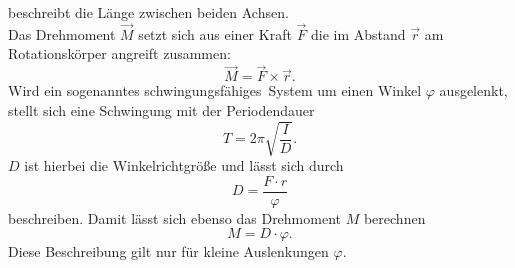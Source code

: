 beschreibt die Länge zwischen beiden Achsen.\\ \noindent
Das Drehmoment $\vec M$ setzt sich aus einer Kraft $\vec F$ die im Abstand $\vec r$ am Rotationskörper 
angreift zusammen:
\begin{equation}
    \vec M=\vec F\times\vec r.
\end{equation}
Wird ein sogenanntes \glqq schwingungsfähiges\grqq\, System um einen Winkel $\varphi$ ausgelenkt,
stellt sich eine Schwingung mit der  Periodendauer 
\begin{equation}
    T=2\pi\sqrt{\frac{I}{D}}.
    \label{eq:Schwingungsdauer}
\end{equation}
$D$ ist hierbei die Winkelrichtgröße und lässt sich durch 
\begin{equation}
    D=\frac{F\cdot r}{\varphi} 
\end{equation}
beschreiben. Damit lässt sich ebenso das Drehmoment $M$ berechnen 
\begin{equation}
    M=D\cdot \varphi.
\end{equation}
Diese Beschreibung gilt nur für kleine Auslenkungen $\varphi$.